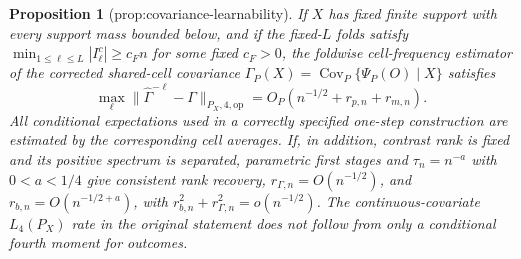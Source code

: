 \documentclass{article}
\newtheorem{proposition}{Proposition}
\begin{document}
\begin{proposition}[prop:covariance-learnability]\label{prop:covariance-learnability}
If \(X\) has fixed finite support with every support mass bounded below, and if the fixed-\(L\) folds satisfy \(\min_{1\le\ell\le L}|I_\ell^c|\ge c_Fn\) for some fixed \(c_F>0\), the foldwise cell-frequency estimator of the corrected shared-cell covariance \(\Gamma_P(X)=\operatorname{Cov}_P\{\Psi_P(O)\mid X\}\) satisfies
\[
\max_\ell\|\widehat\Gamma^{-\ell}-\Gamma\|_{P_X,4,\mathrm{op}}
=O_P(n^{-1/2}+r_{p,n}+r_{m,n}).
\]
All conditional expectations used in a correctly specified one-step construction are estimated by the corresponding cell averages. If, in addition, contrast rank is fixed and its positive spectrum is separated, parametric first stages and \(\tau_n=n^{-a}\) with \(0<a<1/4\) give consistent rank recovery, \(r_{\Gamma,n}=O(n^{-1/2})\), and \(r_{b,n}=O(n^{-1/2+a})\), with \(r_{b,n}^2+r_{\Gamma,n}^2=o(n^{-1/2})\). The continuous-covariate \(L_4(P_X)\) rate in the original statement does not follow from only a conditional fourth moment for outcomes.
\end{proposition}
\end{document}
